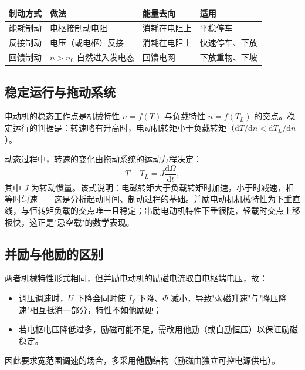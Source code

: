 \begin{center}
\begin{tabular}{@{}p{2.2cm}p{4.2cm}p{3.6cm}p{3.2cm}@{}}
\toprule
制动方式 & 做法 & 能量去向 & 适用 \\
\midrule
能耗制动 & 电枢接制动电阻 & 消耗在电阻上 & 平稳停车 \\
反接制动 & 电压（或电枢）反接 & 消耗在电阻上 & 快速停车、下放 \\
回馈制动 & $n>n_0$ 自然进入发电态 & 回馈电网 & 下放重物、下坡 \\
\bottomrule
\end{tabular}
\end{center}

\subsection{稳定运行与拖动系统}
电动机的稳态工作点是机械特性 $n=f(T)$ 与负载特性 $n=f(T_L)$ 的交点。稳定运行的判据是：转速略有升高时，电动机转矩小于负载转矩（$\mathrm{d}T/\mathrm{d}n<\mathrm{d}T_L/\mathrm{d}n$）。

动态过程中，转速的变化由拖动系统的运动方程决定：
\begin{equation}
T-T_L=J\frac{\mathrm{d}\Omega}{\mathrm{d}t},
\end{equation}
其中 $J$ 为转动惯量。该式说明：电磁转矩大于负载转矩时加速，小于时减速，相等时匀速——这是分析起动时间、制动过程的基础。并励电动机机械特性为下垂直线，与恒转矩负载的交点唯一且稳定；串励电动机特性下垂很陡，轻载时交点上移极快，这正是"忌空载"的数学表现。

\subsection{并励与他励的区别}
两者机械特性形式相同，但并励电动机的励磁电流取自电枢端电压，故：
\begin{itemize}
  \item 调压调速时，$U$ 下降会同时使 $I_f$ 下降、$\Phi$ 减小，导致"弱磁升速"与"降压降速"相互抵消一部分，特性不如他励硬；
  \item 若电枢电压降低过多，励磁可能不足，需改用他励（或自励恒压）以保证励磁稳定。
\end{itemize}
因此要求宽范围调速的场合，多采用\textbf{他励}结构（励磁由独立可控电源供电）。

